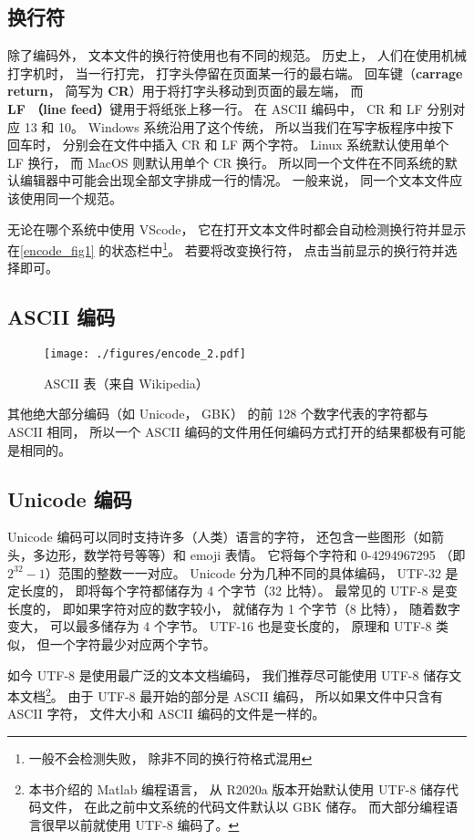 \subsection{换行符}
除了编码外， 文本文件的换行符使用也有不同的规范。 历史上， 人们在使用机械打字机时， 当一行打完， 打字头停留在页面某一行的最右端。 回车键（\textbf{carrage return}， 简写为 \textbf{CR}）用于将打字头移动到页面的最左端， 而 \textbf{LF （line feed）}键用于将纸张上移一行。 在 ASCII 编码中， CR 和 LF 分别对应 13 和 10。 Windows 系统沿用了这个传统， 所以当我们在写字板程序中按下回车时， 分别会在文件中插入 CR 和 LF 两个字符。 Linux 系统默认使用单个 LF 换行， 而 MacOS 则默认用单个 CR 换行。 所以同一个文件在不同系统的默认编辑器中可能会出现全部文字排成一行的情况。 一般来说， 同一个文本文件应该使用同一个规范。

无论在哪个系统中使用 VScode， 它在打开文本文件时都会自动检测换行符并显示在\autoref{encode_fig1} 的状态栏中\footnote{一般不会检测失败， 除非不同的换行符格式混用}。 若要将改变换行符， 点击当前显示的换行符并选择即可。

\subsection{ASCII 编码}
\begin{figure}[ht]
\centering
\texttt{[image: ./figures/encode\_2.pdf]}
\caption{ASCII 表（来自 Wikipedia）} \label{encode_fig2}
\end{figure}


其他绝大部分编码（如 Unicode， GBK） 的前 128 个数字代表的字符都与 ASCII 相同， 所以一个 ASCII 编码的文件用任何编码方式打开的结果都极有可能是相同的。

\subsection{Unicode 编码}
Unicode 编码可以同时支持许多（人类）语言的字符， 还包含一些图形（如箭头，多边形，数学符号等等）和 emoji 表情。 它将每个字符和 0-4294967295 （即 $2^{32}-1$）范围的整数一一对应。 Unicode 分为几种不同的具体编码， UTF-32 是定长度的， 即将每个字符都储存为 4 个字节（32 比特）。 最常见的 UTF-8 是变长度的， 即如果字符对应的数字较小， 就储存为 1 个字节（8 比特）， 随着数字变大， 可以最多储存为 4 个字节。 UTF-16 也是变长度的， 原理和 UTF-8 类似， 但一个字符最少对应两个字节。

如今 UTF-8 是使用最广泛的文本文档编码， 我们推荐尽可能使用 UTF-8 储存文本文档\footnote{本书介绍的 Matlab 编程语言， 从 R2020a 版本开始默认使用 UTF-8 储存代码文件， 在此之前中文系统的代码文件默认以 GBK 储存。 而大部分编程语言很早以前就使用 UTF-8 编码了。}。 由于 UTF-8 最开始的部分是 ASCII 编码， 所以如果文件中只含有 ASCII 字符， 文件大小和 ASCII 编码的文件是一样的。

